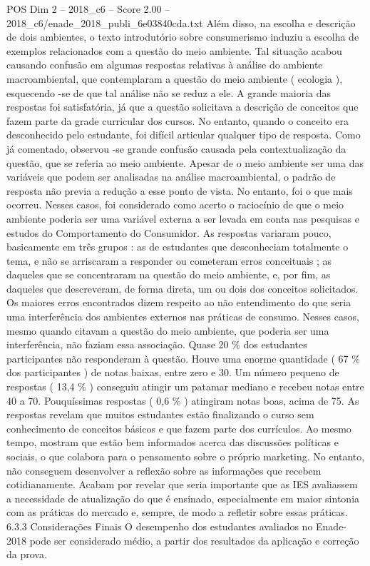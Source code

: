 \begin{textsample}{POS Dim 2 – 2018\_c6 – Score 2.00 – 2018\_c6/enade\_2018\_publi\_6e03840cda.txt}
Além disso, na escolha e descrição de dois ambientes, o texto introdutório sobre consumerismo induziu a escolha de exemplos relacionados com a questão do meio ambiente.
Tal situação acabou causando confusão em algumas respostas relativas à análise do ambiente macroambiental, que contemplaram a questão do meio ambiente ( ecologia ), esquecendo -se de que tal análise não se reduz a ele.
A grande maioria das respostas foi satisfatória, já que a questão solicitava a descrição de conceitos que fazem parte da grade curricular dos cursos.
No entanto, quando o conceito era desconhecido pelo estudante, foi difícil articular qualquer tipo de resposta.
Como já comentado, observou -se grande confusão causada pela contextualização da questão, que se referia ao meio ambiente.
Apesar de o meio ambiente ser uma das variáveis que podem ser analisadas na análise macroambiental, o padrão de resposta não previa a redução a esse ponto de vista.
No entanto, foi o que mais ocorreu.
Nesses casos, foi considerado como acerto o raciocínio de que o meio ambiente poderia ser uma variável externa a ser levada em conta nas pesquisas e estudos do Comportamento do Consumidor.
As respostas variaram pouco, basicamente em três grupos : as de estudantes que desconheciam totalmente o tema, e não se arriscaram a responder ou cometeram erros conceituais ; as daqueles que se concentraram na questão do meio ambiente, e, por fim, as daqueles que descreveram, de forma direta, um ou dois dos conceitos solicitados.
Os maiores erros encontrados dizem respeito ao não entendimento do que seria uma interferência dos ambientes externos nas práticas de consumo.
Nesses casos, mesmo quando citavam a questão do meio ambiente, que poderia ser uma interferência, não faziam essa associação.
Quase 20 \% dos estudantes participantes não responderam à questão.
Houve uma enorme quantidade ( 67 \% dos participantes ) de notas baixas, entre zero e 30.
Um número pequeno de respostas ( 13,4 \% ) conseguiu atingir um patamar mediano e recebeu notas entre 40 a 70.
Pouquíssimas respostas ( 0,6 \% ) atingiram notas boas, acima de 75.
As respostas revelam que muitos estudantes estão finalizando o curso sem conhecimento de conceitos básicos e que fazem parte dos currículos.
Ao mesmo tempo, mostram que estão bem informados acerca das discussões políticas e sociais, o que colabora para o pensamento sobre o próprio marketing.
No entanto, não conseguem desenvolver a reflexão sobre as informações que recebem cotidianamente.
Acabam por revelar que seria importante que as IES avaliassem a necessidade de atualização do que é ensinado, especialmente em maior sintonia com as práticas do mercado e, sempre, de modo a refletir sobre essas práticas. 6.3.3 Considerações Finais O desempenho dos estudantes avaliados no Enade-2018 pode ser considerado médio, a partir dos resultados da aplicação e correção da prova.

\end{textsample}
